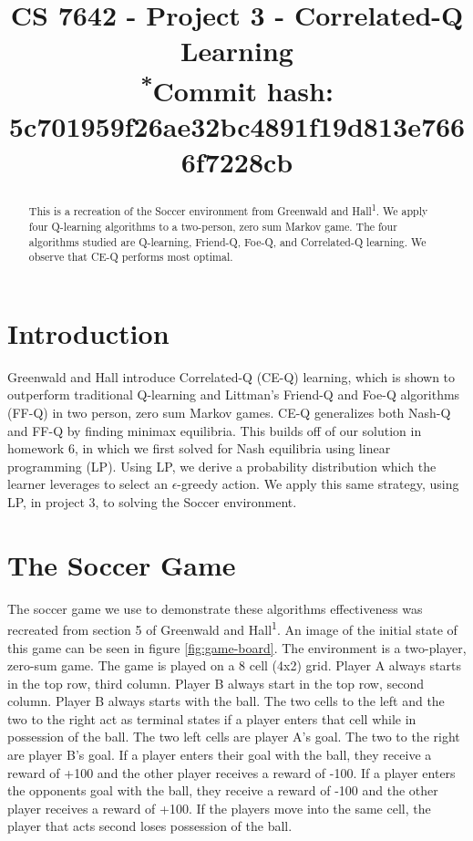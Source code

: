 \documentclass[conference]{IEEEtran}
\begin{document}
\title{
    CS 7642 - Project 3 - Correlated-Q Learning\\
    {\footnotesize \textsuperscript{*}Commit hash: 5c701959f26ae32bc4891f19d813e7666f7228cb}
}

\author{
}

\maketitle

\begin{abstract}
This is a recreation of the Soccer environment from Greenwald and Hall\textsuperscript{1}. We apply four Q-learning algorithms to a two-person, zero sum Markov game. The four algorithms studied are Q-learning, Friend-Q, Foe-Q, and Correlated-Q learning. We observe that CE-Q performs most optimal.
\end{abstract}

\section{Introduction}
Greenwald and Hall introduce Correlated-Q (CE-Q) learning, which is shown to outperform traditional Q-learning and Littman's Friend-Q and Foe-Q algorithms (FF-Q) in two person, zero sum Markov games. CE-Q generalizes both Nash-Q and FF-Q by finding minimax equilibria. This builds off of our solution in homework 6, in which we first solved for Nash equilibria using linear programming (LP). Using LP, we derive a probability distribution which the learner leverages to select an $\epsilon$-greedy action. We apply this same strategy, using LP, in project 3, to solving the Soccer environment.

\section{The Soccer Game}
The soccer game we use to demonstrate these algorithms effectiveness was recreated from section 5 of Greenwald and Hall\textsuperscript{1}. An image of the initial state of this game can be seen in figure \ref{fig:game-board}. The environment is a two-player, zero-sum game. The game is played on a 8 cell (4x2) grid. Player A always starts in the top row, third column. Player B always start in the top row, second column. Player B always starts with the ball. The two cells to the left and the two to the right act as terminal states if a player enters that cell while in possession of the ball. The two left cells are player A's goal. The two to the right are player B's goal. If a player enters their goal with the ball, they receive a reward of +100 and the other player receives a reward of -100. If a player enters the opponents goal with the ball, they receive a reward of -100 and the other player receives a reward of +100. If the players move into the same cell, the player that acts second loses possession of the ball.
\end{document}
